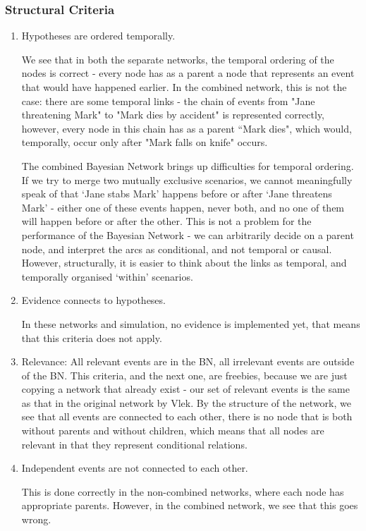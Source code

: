 \subsubsection{Structural Criteria}
\begin{enumerate}
\item Hypotheses are ordered temporally.

We see that in both the separate networks, the temporal ordering of the nodes is correct - every node has as a parent a node that represents an event that would have happened earlier. In the combined network, this is not the case: there are some temporal links - the chain of events from "Jane threatening Mark" to "Mark dies by accident" is represented correctly, however, every node in this chain has as a parent ``Mark dies", which would, temporally, occur only after "Mark falls on knife" occurs.

The combined Bayesian Network brings up difficulties for temporal ordering. If we try to merge two mutually exclusive scenarios, we cannot meaningfully speak of that `Jane stabs Mark' happens before or after `Jane threatens Mark' - either one of these events happen, never both, and no one of them will happen before or after the other. This is not a problem for the performance of the Bayesian Network - we can arbitrarily decide on a parent node, and interpret the arcs as conditional, and not temporal or causal. However, structurally, it is easier to think about the links as temporal, and temporally organised `within' scenarios. 

\item Evidence connects to hypotheses.

In these networks and simulation, no evidence is implemented yet, that means that this criteria does not apply.

\item Relevance: All relevant events are in the BN, all irrelevant events are outside of the BN.
This criteria, and the next one, are freebies, because we are just copying a network that already exist - our set of relevant events is the same as that in the original network by Vlek. By the structure of the network, we see that all events are connected to each other, there is no node that is both without parents and without children, which means that all nodes are relevant in that they represent conditional relations.

\item Independent events are not connected to each other.

This is done correctly in the non-combined networks, where each node has appropriate parents. However, in the combined network, we see that this goes wrong.

\end{enumerate}

